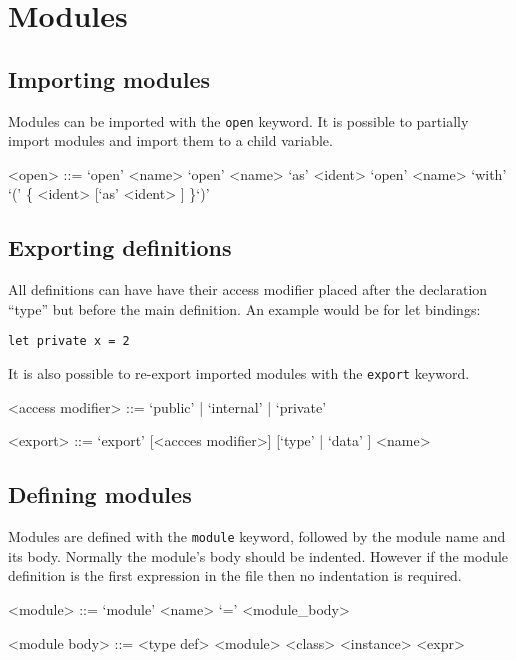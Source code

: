 \section{Modules}

\subsection{Importing modules}
Modules can be imported with the \texttt{open} keyword. It is possible to partially import modules and import them to a child variable.

\begin{grammar}
<open> ::= `open' <name>
      \alt `open' <name> `as' <ident>
      \alt `open' <name> `with' `(' \{ <ident> [`as' <ident> ] \}`)'
\end{grammar}

\subsection{Exporting definitions}
All definitions can have have their access modifier placed after the declaration ``type'' but before the main definition. An example would be for let bindings:

\begin{verbatim}
let private x = 2
\end{verbatim}

It is also possible to re-export imported modules with the \texttt{export} keyword.

\begin{grammar}
<access modifier> ::= `public' | `internal' | `private'

<export>          ::= `export' [<accces modifier>] [`type' | `data' ] <name>
\end{grammar}


\subsection{Defining modules}
Modules are defined with the \texttt{module} keyword, followed by the module name and its body. Normally the module's body should be indented. However if the module definition is the first expression in the file then no indentation is required.

\begin{grammar}
<module>       ::= `module' <name> `=' <module_body>

<module body>  ::= <type def>
              \alt <module>
              \alt <class>
              \alt <instance>
              \alt <expr>
\end{grammar}